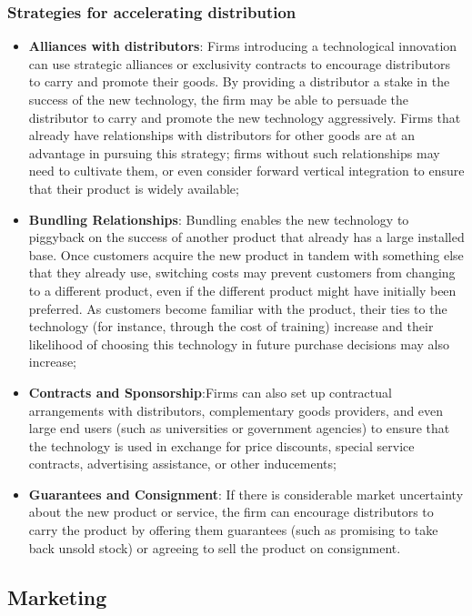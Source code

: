 \documentclass[12pt]{article}
\begin{document}
\subsubsection{Strategies for accelerating distribution}
\begin{itemize}
    \item \textbf{Alliances with distributors}: Firms introducing a technological innovation can use strategic alliances or exclusivity
    contracts to encourage distributors to carry and promote their goods. By providing a
    distributor a stake in the success of the new technology, the firm may be able to persuade
    the distributor to carry and promote the new technology aggressively. Firms that already
    have relationships with distributors for other goods are at an advantage in pursuing this
    strategy; firms without such relationships may need to cultivate them, or even consider
    forward vertical integration to ensure that their product is widely available;
    \item \textbf{Bundling Relationships}: Bundling enables the new technology to piggyback
    on the success of another product that already has a large installed base. Once customers acquire the new product in tandem with something else that they already use,
    switching costs may prevent customers from changing to a different product, even if
    the different product might have initially been preferred. As customers become familiar
    with the product, their ties to the technology (for instance, through the cost of training)
    increase and their likelihood of choosing this technology in future purchase decisions
    may also increase;
    \item \textbf{Contracts and Sponsorship}:Firms can also set up contractual arrangements with distributors, complementary goods
    providers, and even large end users (such as universities or government agencies) to
    ensure that the technology is used in exchange for price discounts, special service contracts, advertising assistance, or other inducements;
    \item \textbf{Guarantees and Consignment}: If there is considerable market uncertainty about the new product or service, the firm
    can encourage distributors to carry the product by offering them guarantees (such as
    promising to take back unsold stock) or agreeing to sell the product on consignment.
\end{itemize}

\subsection{Marketing}
\end{document}
